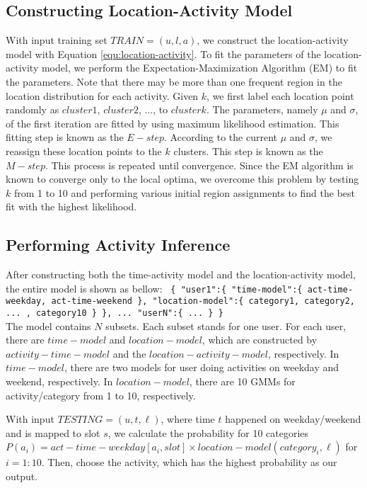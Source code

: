 \subsection{Constructing Location-Activity Model}

With input training set $TRAIN = {(u, l, a)}$, we construct the location-activity model with Equation \ref{equ:location-activity}. To fit the parameters of the location-activity model, we perform the Expectation-Maximization Algorithm (EM) to fit the parameters. Note that there may be more than one frequent region in the location distribution for each activity. Given $k$, we first label each location point randomly as $cluster 1$, $cluster 2$, ..., to $cluster k$. The parameters, namely $\mu$ and $\sigma$, of the first iteration are fitted by using maximum likelihood estimation. This fitting step is known as the $E-step$. According to the current $\mu$ and $\sigma$, we reassign these location points to the $k$ clusters. This step is known as the $M-step$. This process is repeated until convergence. Since the EM algorithm is known to converge only to the local optima, we overcome this problem by testing $k$ from 1 to 10 and performing various initial region assignments to find the best fit with the highest likelihood.


\subsection{Performing Activity Inference}

After constructing both the time-activity model and the location-activity model, the entire model is shown as bellow:
\texttt{ \{
	"user1":\{
		"time-model":\{
			act-time-weekday,
			act-time-weekend
		\},
		"location-model":\{
			category1,
			category2, ... ,
			category10
		\}
	\}, ...
	"userN":\{
		...
	\}
\} }
\\
The model contains $N$ subsets. Each subset stands for one user. For each user, there are $time-model$ and $location-model$, which are constructed by $activity-time-model$ and the $location-activity-model$, respectively. In $time-model$, there are two models for user doing activities on weekday and weekend, respectively. In $location-model$, there are 10 GMMs for activity/category from 1 to 10, respectively. 

With input $TESTING = {(u,t,\ell)}$, where time $t$ happened on weekday/weekend and is mapped to slot $s$, we calculate the probability for 10 categories $P(a_i) = act-time-weekday[a_i, slot] \times location-model(category_i, \ell)$ for $i = 1:10$. Then, choose the activity, which has the highest probability as our output.

